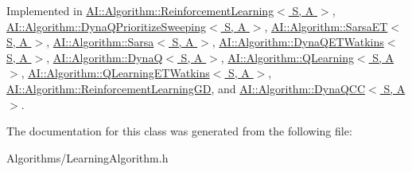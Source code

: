 Implemented in \hyperlink{classAI_1_1Algorithm_1_1ReinforcementLearning_a25d7fa245a79e61061436dc0f1db90cb}{A\-I\-::\-Algorithm\-::\-Reinforcement\-Learning$<$ S, A $>$}, \hyperlink{classAI_1_1Algorithm_1_1DynaQPrioritizeSweeping_ad08b55f3cf927189dd31abf9fc1c2959}{A\-I\-::\-Algorithm\-::\-Dyna\-Q\-Prioritize\-Sweeping$<$ S, A $>$}, \hyperlink{classAI_1_1Algorithm_1_1SarsaET_adf13376b7ec8fdfa2b19ffadb1aa81e7}{A\-I\-::\-Algorithm\-::\-Sarsa\-E\-T$<$ S, A $>$}, \hyperlink{classAI_1_1Algorithm_1_1Sarsa_ae1d62478d3e31cace3fb594e05f83d1c}{A\-I\-::\-Algorithm\-::\-Sarsa$<$ S, A $>$}, \hyperlink{classAI_1_1Algorithm_1_1DynaQETWatkins_aa4e40af0fd705cd5d1f7fd13834c57c6}{A\-I\-::\-Algorithm\-::\-Dyna\-Q\-E\-T\-Watkins$<$ S, A $>$}, \hyperlink{classAI_1_1Algorithm_1_1DynaQ_a4542226b17db4ed8a2c5ec17d37dc42f}{A\-I\-::\-Algorithm\-::\-Dyna\-Q$<$ S, A $>$}, \hyperlink{classAI_1_1Algorithm_1_1QLearning_a042e1987ce21a94f59603c4cb1eeed82}{A\-I\-::\-Algorithm\-::\-Q\-Learning$<$ S, A $>$}, \hyperlink{classAI_1_1Algorithm_1_1QLearningETWatkins_a5cbad8c16dfbf6fe72c85fe5c8c4e273}{A\-I\-::\-Algorithm\-::\-Q\-Learning\-E\-T\-Watkins$<$ S, A $>$}, \hyperlink{classAI_1_1Algorithm_1_1ReinforcementLearningGD_afca8d60ac090dec611f3834c0e8872c0}{A\-I\-::\-Algorithm\-::\-Reinforcement\-Learning\-G\-D}, and \hyperlink{classAI_1_1Algorithm_1_1DynaQCC_ae23b8f0afbb9fc5024aef9ce720c9b84}{A\-I\-::\-Algorithm\-::\-Dyna\-Q\-C\-C$<$ S, A $>$}.



The documentation for this class was generated from the following file\-:\begin{DoxyCompactItemize}
\item 
Algorithms/Learning\-Algorithm.\-h\end{DoxyCompactItemize}
